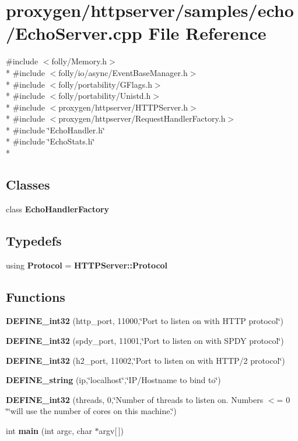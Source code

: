 \section{proxygen/httpserver/samples/echo/\+Echo\+Server.cpp File Reference}
\label{EchoServer_8cpp}
{\ttfamily \#include $<$folly/\+Memory.\+h$>$}\\*
{\ttfamily \#include $<$folly/io/async/\+Event\+Base\+Manager.\+h$>$}\\*
{\ttfamily \#include $<$folly/portability/\+G\+Flags.\+h$>$}\\*
{\ttfamily \#include $<$folly/portability/\+Unistd.\+h$>$}\\*
{\ttfamily \#include $<$proxygen/httpserver/\+H\+T\+T\+P\+Server.\+h$>$}\\*
{\ttfamily \#include $<$proxygen/httpserver/\+Request\+Handler\+Factory.\+h$>$}\\*
{\ttfamily \#include \char`\"{}Echo\+Handler.\+h\char`\"{}}\\*
{\ttfamily \#include \char`\"{}Echo\+Stats.\+h\char`\"{}}\\*
\subsection*{Classes}
\begin{DoxyCompactItemize}
\item 
class {\bf Echo\+Handler\+Factory}
\end{DoxyCompactItemize}
\subsection*{Typedefs}
\begin{DoxyCompactItemize}
\item 
using {\bf Protocol} = {\bf H\+T\+T\+P\+Server\+::\+Protocol}
\end{DoxyCompactItemize}
\subsection*{Functions}
\begin{DoxyCompactItemize}
\item 
{\bf D\+E\+F\+I\+N\+E\+\_\+int32} (http\+\_\+port, 11000,\char`\"{}Port to listen on with H\+T\+TP protocol\char`\"{})
\item 
{\bf D\+E\+F\+I\+N\+E\+\_\+int32} (spdy\+\_\+port, 11001,\char`\"{}Port to listen on with S\+P\+DY protocol\char`\"{})
\item 
{\bf D\+E\+F\+I\+N\+E\+\_\+int32} (h2\+\_\+port, 11002,\char`\"{}Port to listen on with H\+T\+TP/2 protocol\char`\"{})
\item 
{\bf D\+E\+F\+I\+N\+E\+\_\+string} (ip,\char`\"{}localhost\char`\"{},\char`\"{}IP/Hostname to bind to\char`\"{})
\item 
{\bf D\+E\+F\+I\+N\+E\+\_\+int32} (threads, 0,\char`\"{}Number of threads to listen on. Numbers $<$= 0 \char`\"{}\char`\"{}will use the number of cores on this machine.\char`\"{})
\item 
int {\bf main} (int argc, char $\ast$argv[$\,$])
\end{DoxyCompactItemize}


